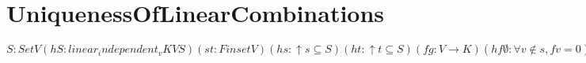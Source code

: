 \section{UniquenessOfLinearCombinations}

\begin{theorem}
  \label{theorem :  linear_combination_unique}
  \leanok
  ${S : Set V} (hS : linear_independent_v K V S) (s t : Finset V) (hs : ↑s \subseteq S) (ht : ↑t \subseteq S) (f g : V \rightarrow K) (hf\emptyset : \forall v \notin s, f v = 0) (hg0 : ∀ v \notin t, g v = 0) (heq : Finset.sum s (fun v \Rightarrow f v \bullet v) = Finset.sum t (fun v \Rightarrow g v \bullet v)) : f = g $
\end{theorem}
